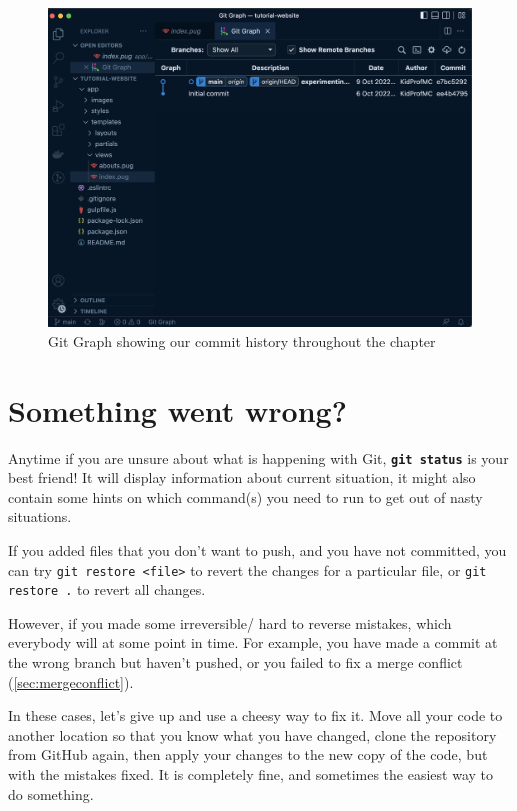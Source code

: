 \begin{figure}[H]
\centering
\includegraphics[width=12cm]{images/ch3-gitgraph2.png}
\caption{Git Graph showing our commit history throughout the chapter}
\end{figure}

\section{Something went wrong?}
\label{sec:gitpractice}

Anytime if you are unsure about what is happening with Git, \textbf{\texttt{git status}} is your best friend! It will display information about current situation, it might also contain some hints on which command(s) you need to run to get out of nasty situations.
\vspace{6mm}

If you added files that you don't want to push, and you have not committed, you can try \texttt{git restore <file>} to revert the changes for a particular file, or \texttt{git restore .} to revert all changes.

However, if you made some irreversible/ hard to reverse mistakes, which everybody will at some point in time. For example, you have made a commit at the wrong branch but haven't pushed, or you failed to fix a merge conflict (\cref{sec:mergeconflict}). 

In these cases, let's give up and use a cheesy way to fix it. Move all your code to another location so that you know what you have changed, clone the repository from GitHub again, then apply your changes to the new copy of the code, but with the mistakes fixed. It is completely fine, and sometimes the easiest way to do something.
\vspace{6mm}

